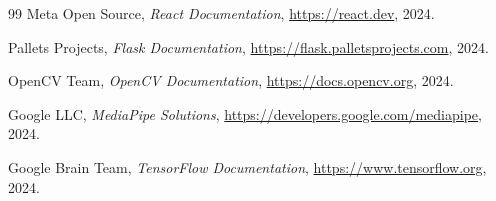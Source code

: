 \begin{thebibliography}{99}
Meta Open Source, \textit{React Documentation}, \url{https://react.dev}, 2024.

Pallets Projects, \textit{Flask Documentation}, \url{https://flask.palletsprojects.com}, 2024.

OpenCV Team, \textit{OpenCV Documentation}, \url{https://docs.opencv.org}, 2024.

Google LLC, \textit{MediaPipe Solutions}, \url{https://developers.google.com/mediapipe}, 2024.

Google Brain Team, \textit{TensorFlow Documentation}, \url{https://www.tensorflow.org}, 2024.

\end{thebibliography}